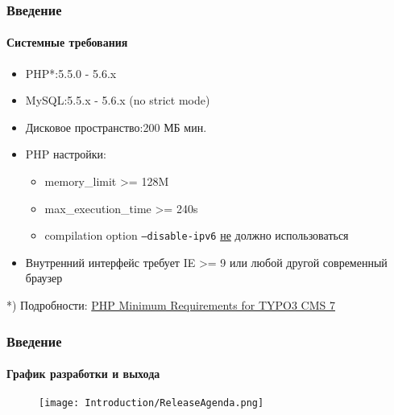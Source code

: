 \begin{frame}[fragile]
	\frametitle{Введение}
	\framesubtitle{Системные требования}

	\begin{itemize}
		\item PHP*:\tabto{4cm}5.5.0 - 5.6.x
		\item MySQL:\tabto{4cm}5.5.x - 5.6.x (no strict mode)
			\item Дисковое пространство:\tabto{4cm}200 МБ мин.
		\item PHP настройки:

			\begin{itemize}
				\item memory\_limit >= 128M
				\item max\_execution\_time >= 240s
					\item compilation option \texttt{--disable-ipv6} \underline{не} должно использоваться
			\end{itemize}

		\item Внутренний интерфейс требует IE >= 9 или любой другой современный браузер

	\end{itemize}

	\vspace{1cm}
	*) Подробности: \href{http://typo3.org/news/article/php-minimum-requirements-for-typo3-cms-7/}{PHP Minimum Requirements for TYPO3 CMS 7}

\end{frame}

\begin{frame}[fragile]
	\frametitle{Введение}
	\framesubtitle{График разработки и выхода}

	\begin{figure}
		\texttt{[image: Introduction/ReleaseAgenda.png]}
	\end{figure}

\end{frame}

